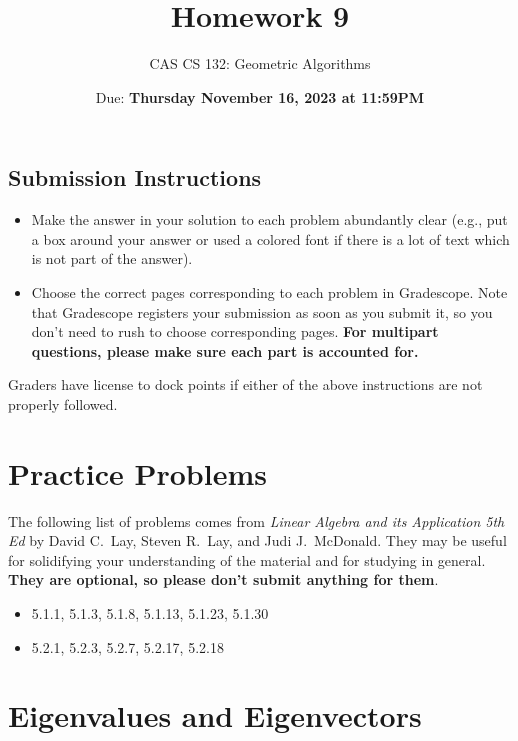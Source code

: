\documentclass{article}
\title{
  Homework 9
}
\author{CAS CS 132: Geometric Algorithms}
\date{Due: \textbf{Thursday November 16, 2023 at 11:59PM}}
\theoremstyle{remark}
\begin{document}
\maketitle

\subsection*{Submission Instructions}
\begin{itemize}
\item Make the answer in your solution to each problem abundantly clear (e.g., put a box around your answer or used a colored font if there is a lot of text which is not part of the answer).
\item Choose the correct pages corresponding to each problem in Gradescope. Note that Gradescope registers your submission as soon as you submit it, so you don't need to rush to choose corresponding pages.
  \textbf{For multipart questions, please make sure each part is accounted for.}
\end{itemize}
Graders have license to dock points if either of the above instructions are not properly followed.


\section*{Practice Problems}

The following list of problems comes from \textit{Linear Algebra and its Application 5th Ed} by David C.\ Lay, Steven R.\ Lay, and Judi J.\ McDonald.
They may be useful for solidifying your understanding of the material and for studying in general.
\textbf{They are optional, so please don't submit anything for them}.

\begin{itemize}
\item 5.1.1, 5.1.3, 5.1.8, 5.1.13, 5.1.23, 5.1.30
\item 5.2.1, 5.2.3, 5.2.7, 5.2.17, 5.2.18
\end{itemize}

\pagebreak
\section{Eigenvalues and Eigenvectors}
\end{document}

